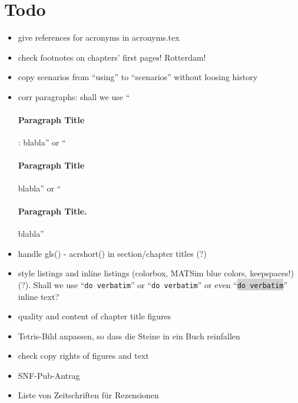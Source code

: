 \section*{Todo}

\begin{itemize}\styleItemize

\item give references for acronyms in acronyms.tex

\item check footnotes on chapters' first pages! Rotterdam!

\item copy scenarios from ``using'' to ``scenarios'' without loosing history

\item corr paragraphs: shall we use ``\paragraph{Paragraph Title}: blabla'' or ``\paragraph{Paragraph Title} blabla'' or ``\paragraph{Paragraph Title.} blabla''

\item handle gls() - acrshort() in section/chapter titles (?)

\item style listings and inline listings (colorbox, MATSim blue colors, keepspaces!) (?). Shall we use ``\verb|do verbatim|'' or ``\lstinline|do verbatim|'' or even ``\colorbox{lightgray}{\lstinline|do verbatim|}'' inline text?

\item quality and content of chapter title figures

\item Tetris-Bild anpassen, so dass die Steine in ein Buch reinfallen

\item check copy rights of figures and text

\item SNF-Pub-Antrag

\item Liste von Zeitschriften für Rezensionen



\end{itemize}
